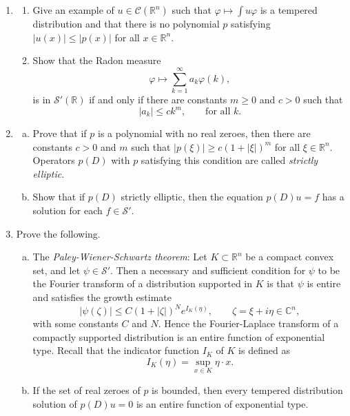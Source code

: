 \documentclass[11pt]{amsart}
\newcommand{\R}{\mathbb{R}}
\newcommand{\C}{\mathbb{C}}
\newcommand{\tstS}{\mathscr{S}}
\newcommand{\tstC}{\mathscr{C}}
\begin{document}
\begin{enumerate}[1.]
\begin{enumerate}[{\em a)}]
\begin{itemize}
\item
First define the Fourier transform on $\tstS'$ by duality, and then restrict it to $L^2$.
\end{itemize}
Show that these two approaches are consistent with each other.
\item
Show that the Fourier transform acting on $L^1$ is not onto $\mathscr{C}_0$.
\end{enumerate}
\item
\begin{enumerate}[{\em a)}]
\item
Give an example of $u\in\tstC(\R^n)$ such that $\varphi\mapsto\int u\varphi$ is a tempered distribution and that there is no polynomial $p$ satisfying 
$|u(x)|\leq|p(x)|$ for all $x\in\R^n$.
\item
Show that the Radon measure
$$
\varphi\mapsto\sum_{k=1}^\infty a_k \varphi(k) ,
$$
is in $\tstS'(\R)$ if and only if there are constants $m\geq0$ and $c>0$ such that
$$
|a_k| \leq ck^m ,
\qquad \textrm{for all} \,\, k .
$$
\end{enumerate}
\item
\begin{enumerate}[a)]
\item
Prove that if $p$ is a polynomial with no real zeroes, then there are constants $c>0$ and $m$ such that $|p(\xi)|\geq c(1+|\xi|)^m$ for all $\xi\in\R^n$.
Operators $p(D)$ with $p$ satisfying this condition are called {\em strictly elliptic}.
\item
Show that if $p(D)$ strictly elliptic, then the equation $p(D)u=f$ has a solution for each $f\in\tstS'$.
\end{enumerate}
\item
Prove the following.
\begin{enumerate}[a)]
\item
The {\em Paley-Wiener-Schwartz theorem}:
Let $K\subset\R^n$ be a compact convex set, and let $\psi\in\tstS'$.
Then a necessary and sufficient condition for $\psi$ to be the Fourier transform of a distribution supported in $K$
is that $\psi$ is entire and satisfies the growth estimate
$$
|\psi(\zeta)| \leq C(1+|\zeta|)^{N} e^{I_K(\eta)},
\qquad \zeta=\xi+i\eta\in\C^n,
$$
with some constants $C$ and $N$.
Hence the Fourier-Laplace transform of a compactly supported distribution is an entire function of exponential type.
Recall that the indicator function $I_K$ of $K$ is defined as
$$
I_K(\eta) = \sup_{x\in K} \eta\cdot x.
$$
\item
If the set of real zeroes of $p$ is bounded, then every tempered distribution solution of $p(D)u=0$ is an entire function of exponential type.

\end{enumerate}
\end{enumerate}
\end{document}
